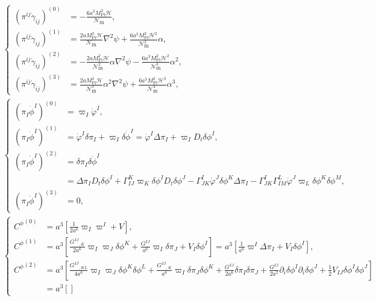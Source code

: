 \documentclass[aps, prd
, preprint
, nofootinbib 
, notitlepage
, longbibliography
]{revtex4-1}
\newcommand{\Mpl}{M_\text{Pl}}
\newcommand{\IR}{\text{IR}}
\newcommand{\dps}{\displaystyle}
\newcommand{\calH}{\mathcal{H}}
\newcommand{\calN}{\mathcal{N}}
\newcommand{\dphi}{\delta\phi}
\newcommand{\dpi}{\delta\pi}
\newcommand{\Dpi}{\Delta\pi}
\newcommand{\bae}[1]{\begin{align} #1 \end{align}}
\newcommand{\bce}[1]{\begin{cases} #1 \end{cases}}
\begin{document}
\bae{
    &\bce{
        \dps
        (\pi^{ij}\dot{\gamma}_{ij})^{(0)} &
        \dps
        =-\frac{6a^3\Mpl^2\calH}{\calN_\IR}, \\
        \dps
        (\pi^{ij}\dot{\gamma}_{ij})^{(1)} &
        \dps
        =\frac{2a\Mpl^2\calH}{\calN_\IR}\nabla^2\psi+\frac{6a^3\Mpl^2\calH^2}{\calN_\IR^2}\alpha, \\
        \dps
        (\pi^{ij}\dot{\gamma}_{ij})^{(2)} &
        \dps
        =-\frac{2a\Mpl^2\calH}{\calN_\IR^2}\alpha\nabla^2\psi-\frac{6a^3\Mpl^2\calH^2}{\calN_\IR^3}\alpha^2, \\
        \dps
        (\pi^{ij}\dot{\gamma}_{ij})^{(3)} &
        \dps
        =\frac{2a\Mpl^2\calH}{\calN_\IR^3}\alpha^2\nabla^2\psi+\frac{6a^3\Mpl^2\calH^2}{\calN_\IR^4}\alpha^3,
    } \\
    &\bce{
        \dps
        (\pi_I\dot{\phi}^I)^{(0)} & 
        \dps
        =\varpi_I\dot{\varphi}^I, \\
        \dps
        (\pi_I\dot{\phi}^I)^{(1)} &
        \dps
        =\dot{\varphi}^I\dpi_I+\varpi_I\delta\dot{\phi}^I=\dot{\varphi}^I\Dpi_I+\varpi_ID_t\dphi^I, \\
        \dps
        (\pi_I\dot{\phi}^I)^{(2)} &
        \dps
        =\dpi_I\delta\dot{\phi}^I \\
        &\dps
        =\Dpi_ID_t\dphi^I+\Gamma^K_{IJ}\varpi_K\dphi^ID_t\dphi^J-\Gamma^I_{JK}\dot{\varphi}^J\dphi^K\Dpi_I-\Gamma^I_{JK}\Gamma^L_{IM}\dot{\varphi}^J\varpi_L\dphi^K\dphi^M, \\
        \dps
        (\pi_I\dot{\phi}^I)^{(3)} &
        \dps
        =0,
    } \\
    &\bce{
        \dps
        {C^\phi}^{(0)} &
        \dps
        =a^3\left[\frac{1}{2a^6}\varpi_I\varpi^I+V\right], \\
        \dps
        {C^\phi}^{(1)} &
        \dps
        =a^3\left[\frac{G^{IJ}{}_{,K}}{2a^6}\varpi_I\varpi_J\dphi^K+\frac{G^{IJ}}{a^6}\varpi_I\dpi_J+V_I\dphi^I\right]=a^3\left[\frac{1}{a^6}\varpi^I\Dpi_I+V_I\dphi^I\right], \\
        \dps
        {C^\phi}^{(2)} &
        \dps
        =a^3\left[\frac{G^{IJ}{}_{,KL}}{4a^6}\varpi_I\varpi_J\dphi^K\dphi^L+\frac{G^{IJ}{}_{,K}}{a^6}\varpi_I\dpi_J\dphi^K+\frac{G^{IJ}}{2a^6}\dpi_I\dpi_J+\frac{G^{IJ}}{2a^2}\partial_i\dphi^I\partial_i\dphi^J+\frac{1}{2}V_{IJ}\dphi^I\dphi^J\right] \\
        &\dps
        =a^3\left[\right]
    }
}

















\end{document}
